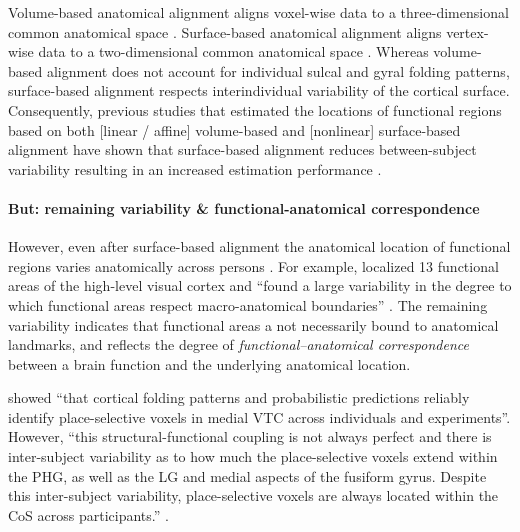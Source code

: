Volume-based anatomical alignment \citep[s.][for a review]{klein2009evaluation}
aligns voxel-wise data to a three-dimensional common anatomical space
\citep[e.g., MNI152 template;][]{fonov2011unbiased}.
Surface-based anatomical alignment \citep{fischl1999cortical, yeo2009spherical}
aligns vertex-wise data to a two-dimensional common anatomical space
\citep[e.g., FreeSurfer fsaverage template;][]{fischl1999high}.
Whereas volume-based alignment does not account for individual sulcal and gyral
folding patterns, surface-based alignment respects interindividual variability
of the cortical surface.
Consequently, previous studies that estimated the locations of functional
regions based on both [linear / affine] volume-based and [nonlinear]
surface-based alignment have shown that surface-based alignment reduces
between-subject variability resulting in an increased estimation performance
\citep{rosenke2021probabilistic, frost2012measuring, wang2015probabilistic,
weiner2018defining}.


\paragraph{But: remaining variability \& functional-anatomical correspondence}

However, even after surface-based alignment the anatomical location of
functional regions varies anatomically across persons
\citep[e.g.,][]{coalson2018impact, benson2014correction, natu2021sulcal,
wang2015probabilistic, frost2012measuring, langers2014assessment, weiner2014mid,
rosenke2021probabilistic}.
For example, \citet{frost2012measuring} localized 13 functional areas of the
high-level visual cortex and ``found a large variability in the degree to which
functional areas respect macro-anatomical boundaries''
\citep{frost2012measuring}.
The remaining variability indicates that functional areas a not necessarily
bound to anatomical landmarks, and reflects the degree of
\textit{functional--anatomical correspondence} between a brain function and the
underlying anatomical location.



%
\citet{weiner2018defining} showed ``that cortical folding patterns and
probabilistic predictions reliably identify place-selective voxels in medial VTC
across individuals and experiments''.
%
However, ``this structural-functional coupling is not always perfect and there
is inter-subject variability as to how much the place-selective voxels extend
within the PHG, as well as the LG and medial aspects of the fusiform gyrus.
%
Despite this inter-subject variability, place-selective voxels are always
located within the CoS across participants.'' \citep{weiner2018defining}.



